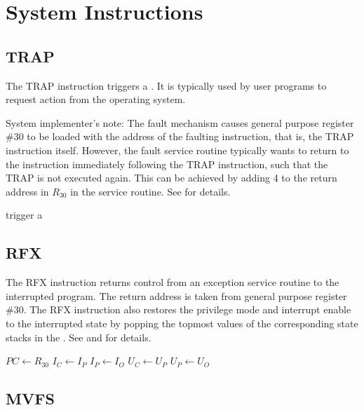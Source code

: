 \section{System Instructions}

\subsection{TRAP}

The TRAP instruction triggers a . It is typically used by user programs to request action from the operating system.

System implementer's note: The fault mechanism causes general purpose register \#30 to be loaded with the address of the faulting instruction, that is, the TRAP instruction itself. However, the fault service routine typically wants to return to the instruction immediately following the TRAP instruction, such that the TRAP is not executed again. This can be achieved by adding 4 to the return address in $R_{30}$ in the service routine. See  for details.


\begin{effectize}
\effect trigger a 
\end{effectize}

\subsection{RFX}

The RFX instruction returns control from an exception service routine to the interrupted program. The return address is taken from general purpose register \#30. The RFX instruction also restores the privilege mode and interrupt enable to the interrupted state by popping the topmost values of the corresponding state stacks in the \pswx. See  and  for details.


\begin{effectize}
\priveffect
\effect $PC \leftarrow R_{30}$
\effect $I_C \leftarrow I_P$
\effect $I_P \leftarrow I_O$
\effect $U_C \leftarrow U_P$
\effect $U_P \leftarrow U_O$
\end{effectize}

\subsection{MVFS}

